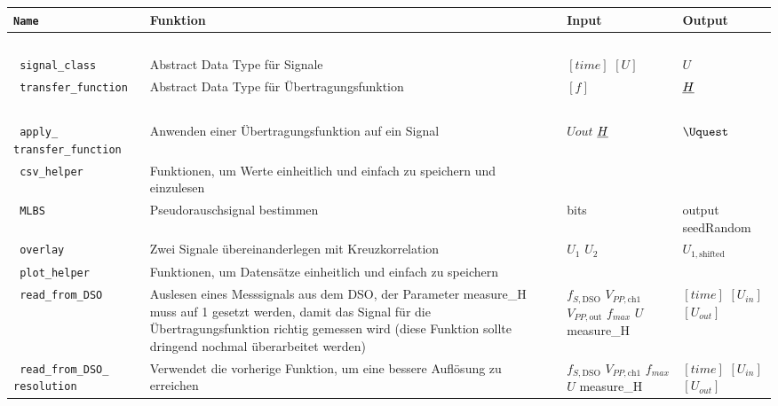 \documentclass[../Report.tex]{subfiles}
\begin{document}
\begin{table}[H]
\centering 
\begin{tabular}[t]{| >{\texttt\bgroup}m{3.5cm}<{\egroup}|m{8cm}|m{2cm}|m{2cm}|} 
  \hline
    \textrm{\textbf{Name}} & \textbf{Funktion} & \textbf{Input} & \textbf{Output} \\ 
  \hline \hline
    \multicolumn{4}{|c|}{classes} \\
  \hline \hline
  signal\_class & Abstract Data Type für Signale & $[time]$ \newline $[U]$  & $U$\\
  \hline
  transfer\_function & Abstract Data Type für Übertragungsfunktion & $[f]$ & $\underline{H}$\\
  \hline \hline
    \multicolumn{4}{|c|}{helpers} \\
  \hline \hline
  apply\_ \newline transfer\_function & Anwenden einer Übertragungsfunktion auf ein Signal & $Uout$ \newline $\underline{H}$  & $\Uquest$\\
  \hline
  csv\_helper & Funktionen, um Werte einheitlich und einfach zu speichern und einzulesen &  & \\
  \hline
  MLBS & Pseudorauschsignal bestimmen & bits & output \newline seedRandom\\
  \hline
  overlay & Zwei Signale übereinanderlegen mit Kreuzkorrelation & $U_1$ \newline $U_2$ & $U_{1,\textrm{shifted}}$\\
  \hline
  plot\_helper & Funktionen, um Datensätze einheitlich und einfach zu speichern & & \\
  \hline
  read\_from\_DSO & Auslesen eines Messsignals aus dem DSO, der Parameter measure\_H muss auf 1 gesetzt werden, damit das Signal für die Übertragungsfunktion richtig gemessen wird (diese Funktion sollte dringend nochmal überarbeitet werden) & $f_{S,\textrm{DSO}}$ \newline $V_{PP,\textrm{ch1}}$ \newline $V_{PP,\textrm{out}}$ \newline $f_{max}$ \newline $U$ \newline measure\_H & $[time]$ \newline $[U_{in}]$ \newline $[U_{out}]$\\
  \hline
  read\_from\_DSO\_ \newline resolution & Verwendet die vorherige Funktion, um eine bessere Auflösung zu erreichen & $f_{S,\textrm{DSO}}$ \newline $V_{PP,\textrm{ch1}}$ \newline $f_{max}$ \newline $U$ \newline measure\_H & $[time]$ \newline $[U_{in}]$ \newline $[U_{out}]$\\

\end{tabular}
\end{table}
\end{document}
